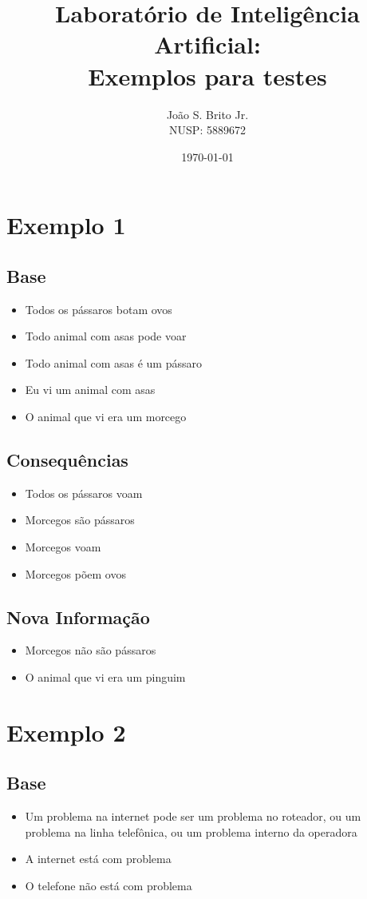 \documentclass[10pt,a4paper]{amsart}
\author{Jo\~ao S. Brito Jr.\\NUSP: 5889672}
\title{Laboratório de Inteligência Artificial: \\Exemplos para testes}
\date{\today}
\begin{document}

\maketitle

\section{Exemplo 1}
\subsection{Base}
\begin{itemize}
 \item Todos os pássaros botam ovos
 \item Todo animal com asas pode voar
 \item Todo animal com asas é um pássaro
 \item Eu vi um animal com asas
 \item O animal que vi era um morcego
\end{itemize}
\subsection{Consequências}
\begin{itemize}
 \item Todos os pássaros voam
 \item Morcegos são pássaros
 \item Morcegos voam
 \item Morcegos põem ovos
\end{itemize}
\subsection{Nova Informação}
\begin{itemize}
 \item Morcegos não são pássaros
 \item O animal que vi era um pinguim
\end{itemize}

\section{Exemplo 2}
\subsection{Base}
\begin{itemize}
 \item Um problema na internet pode ser um problema no roteador, ou um problema na linha telefônica, ou um problema interno da operadora
 \item A internet está com problema
 \item O telefone não está com problema
\end{itemize}
\end{document}
